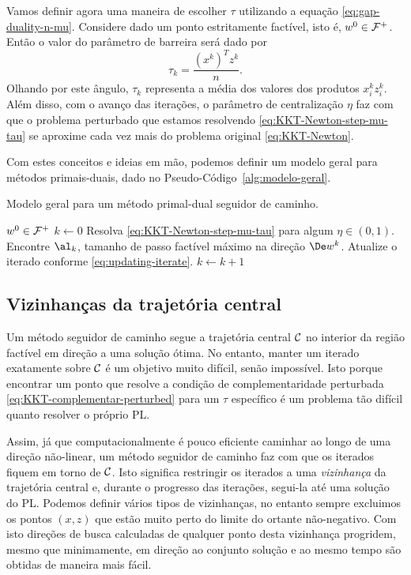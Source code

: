 Vamos definir agora uma maneira de escolher $\tau$ utilizando a equação
\eqref{eq:gap-duality-n-mu}. Considere  dado  um ponto estritamente
factível, isto é, $w^0\in \mathcal{F}^+$. Então o valor do parâmetro de
barreira  será dado por 
\begin{equation}
\label{eq:tau_k}
\tau_k = \frac{(x^k)^Tz^k}{n}. 
\end{equation}
Olhando por este ângulo, $\tau_k$ representa a média dos valores dos produtos
$x_i^k z_i^k$. Além disso, com o avanço das iterações, o parâmetro de
centralização $\eta$ faz com  que o problema perturbado que estamos resolvendo
\eqref{eq:KKT-Newton-step-mu-tau} se aproxime cada vez mais do problema original \eqref{eq:KKT-Newton}.

 

Com estes conceitos e ideias em  mão, podemos definir um modelo geral para
métodos primais-duais, dado no Pseudo-Código~\ref{alg:modelo-geral}.
\begin{algorithm}
\caption{Modelo geral para um método primal-dual seguidor de caminho.}
\label{alg:modelo-geral}
\begin{algorithmic}[0] 
\Require  $w^0\in\mathcal{F}^+$ 
\State $k\gets 0$
	\Repeat
		\State Resolva \eqref{eq:KKT-Newton-step-mu-tau}  para algum $\eta\in(0,1)$.
		\State Encontre $\al_k$, tamanho de passo factível máximo  na direção $\Dew^k$.
		\State Atualize o iterado conforme \eqref{eq:updating-iterate}.
		\State $k\gets k+1$
\end{algorithmic}
\end{algorithm}



\subsection{Vizinhanças da trajetória central}
\label{subsec:neighbouhoods}

Um método seguidor de caminho segue  a trajetória central $\mathcal{C}$ no interior
da região factível em direção a uma solução ótima. No entanto, manter um
iterado exatamente sobre $\mathcal{C}$ é um objetivo muito difícil, senão impossível.
Isto porque encontrar um ponto que resolve a condição de complementaridade
perturbada \eqref{eq:KKT-complementar-perturbed} para um $\tau$ específico é um
problema tão difícil quanto resolver o próprio \ac{PL}.


Assim, já que computacionalmente é pouco eficiente caminhar ao longo de uma
direção não-linear, um método seguidor de caminho faz com que os iterados
fiquem em torno de $\mathcal{C}$. Isto significa restringir os iterados a uma
\emph{vizinhança} da trajetória central e, durante o progresso das iterações,
segui-la até uma solução do \ac{PL}. Podemos definir vários tipos de
vizinhanças, no entanto sempre excluimos os pontos $(x,z)$ que estão muito perto
do limite do ortante não-negativo. Com isto  direções de busca calculadas de
qualquer ponto desta vizinhança progridem, mesmo que minimamente, em direção ao
conjunto solução e ao mesmo tempo são obtidas de maneira mais fácil.

